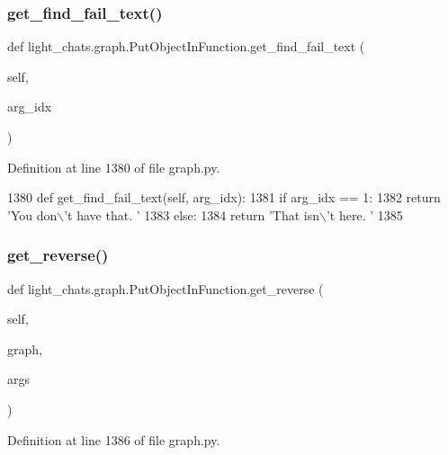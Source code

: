 \subsubsection{\texorpdfstring{get\+\_\+find\+\_\+fail\+\_\+text()}{get\_find\_fail\_text()}}
{\footnotesize\ttfamily def light\+\_\+chats.\+graph.\+Put\+Object\+In\+Function.\+get\+\_\+find\+\_\+fail\+\_\+text (\begin{DoxyParamCaption}\item[{}]{self,  }\item[{}]{arg\+\_\+idx }\end{DoxyParamCaption})}



Definition at line 1380 of file graph.\+py.


\begin{DoxyCode}
1380     \textcolor{keyword}{def }get\_find\_fail\_text(self, arg\_idx):
1381         \textcolor{keywordflow}{if} arg\_idx == 1:
1382             \textcolor{keywordflow}{return} \textcolor{stringliteral}{'You don\(\backslash\)'t have that. '}
1383         \textcolor{keywordflow}{else}:
1384             \textcolor{keywordflow}{return} \textcolor{stringliteral}{'That isn\(\backslash\)'t here. '}
1385 
\end{DoxyCode}
\mbox{\label{classlight__chats_1_1graph_1_1PutObjectInFunction_a2e1c568fb874c53d06f12f0fc4349713}} 
\subsubsection{\texorpdfstring{get\+\_\+reverse()}{get\_reverse()}}
{\footnotesize\ttfamily def light\+\_\+chats.\+graph.\+Put\+Object\+In\+Function.\+get\+\_\+reverse (\begin{DoxyParamCaption}\item[{}]{self,  }\item[{}]{graph,  }\item[{}]{args }\end{DoxyParamCaption})}



Definition at line 1386 of file graph.\+py.


